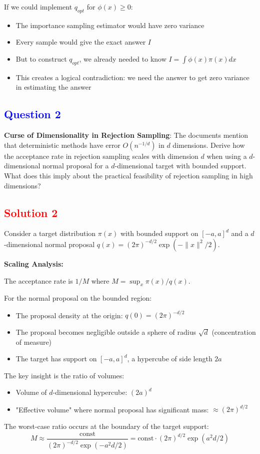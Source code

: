 \documentclass[11pt]{article}
\newcommand{\question}[1]{\subsection*{\textcolor{blue}{Question #1}}}
\newcommand{\solution}[1]{\subsection*{\textcolor{red}{Solution #1}}}
\begin{document}
If we could implement $q_{opt}$ for $\phi(x) \geq 0$:
\begin{itemize}
\item The importance sampling estimator would have zero variance
\item Every sample would give the exact answer $I$
\item But to construct $q_{opt}$, we already needed to know $I = \int \phi(x)\pi(x)dx$
\item This creates a logical contradiction: we need the answer to get zero variance in estimating the answer
\end{itemize}

\question{2}
\textbf{Curse of Dimensionality in Rejection Sampling}: The documents mention that deterministic methods have error $O(n^{-1/d})$ in $d$ dimensions. Derive how the acceptance rate in rejection sampling scales with dimension $d$ when using a $d$-dimensional normal proposal for a $d$-dimensional target with bounded support. What does this imply about the practical feasibility of rejection sampling in high dimensions?

\solution{2}
Consider a target distribution $\pi(x)$ with bounded support on $[-a,a]^d$ and a $d$-dimensional normal proposal $q(x) = (2\pi)^{-d/2}\exp(-\|x\|^2/2)$.

\textbf{Scaling Analysis:}

The acceptance rate is $1/M$ where $M = \sup_x \pi(x)/q(x)$.

For the normal proposal on the bounded region:
\begin{itemize}
\item The proposal density at the origin: $q(0) = (2\pi)^{-d/2}$
\item The proposal becomes negligible outside a sphere of radius $\sqrt{d}$ (concentration of measure)
\item The target has support on $[-a,a]^d$, a hypercube of side length $2a$
\end{itemize}

The key insight is the ratio of volumes:
\begin{itemize}
\item Volume of $d$-dimensional hypercube: $(2a)^d$
\item "Effective volume" where normal proposal has significant mass: $\approx (2\pi)^{d/2}$
\end{itemize}

The worst-case ratio occurs at the boundary of the target support:
$$M \approx \frac{\text{const}}{(2\pi)^{-d/2}\exp(-a^2d/2)} = \text{const} \cdot (2\pi)^{d/2}\exp(a^2d/2)$$
\end{document}
